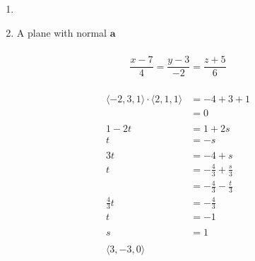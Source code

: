 \documentclass{article}
\begin{document}
\setcounter{subsubsection}{36}
\subsubsection{}

\begin{enumerate}
  \item

  \item A plane with normal $\mathbf{a}$
\end{enumerate}

\setcounter{subsubsection}{38}
\subsubsection{}

\[\frac{x - 7}{4} = \frac{y - 3}{-2} = \frac{z + 5}{6}\]

\setcounter{subsubsection}{40}
\subsubsection{}

\begin{align*}
  \langle -2, 3, 1 \rangle \cdot \langle 2, 1, 1 \rangle & = -4 + 3 + 1                 \\
                                                         & = 0                          \\ \\
  1 - 2 t                                                & = 1 + 2 s                    \\
  t                                                      & = -s                         \\ \\
  3 t                                                    & = -4 + s                     \\
  t                                                      & = -\frac{4}{3} + \frac{s}{3} \\
                                                         & = -\frac{4}{3} - \frac{t}{3} \\
  \frac{4}{3} t                                          & = -\frac{4}{3}               \\
  t                                                      & = -1                         \\ \\
  s                                                      & = 1                          \\ \\
  \langle 3, -3, 0 \rangle
\end{align*}
\end{document}
